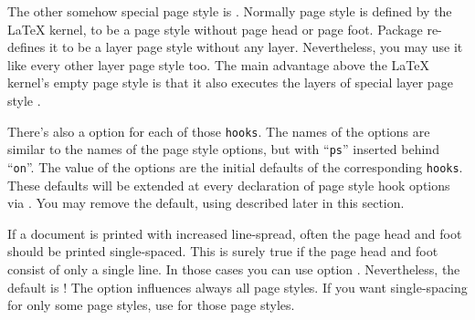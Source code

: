 The other somehow special page style is . Normally page style
 is defined by the \LaTeX{} kernel, to be a page style
without page head or page foot. Package  re-defines it to be
a layer page style without any layer. Nevertheless, you may use it like every
other layer page style too. The main advantage above the \LaTeX{} kernel's
empty page style is that it also executes the layers of special layer page
style .%
\EndIndexGroup


\begin{Declaration}
\end{Declaration}
There's also a \KOMAScript{} option for each of those \texttt{hooks}. The
names of the \KOMAScript{} options are similar to the names of the page style
options, but with ``\texttt{ps}'' inserted behind ``\texttt{on}''. The value
of the \KOMAScript{} options are the initial defaults of the corresponding
\texttt{hooks}. These defaults will be extended at every declaration of page
style hook options via . You may remove the default, using
 described later in this section.%
\EndIndexGroup


\begin{Declaration}
\end{Declaration}
If a
document is printed with increased line-spread, often the page head and foot
should be printed single-spaced. This is surely true if the page head and foot
consist of only a single line. In those cases you can use \KOMAScript{} option
. Nevertheless, the default is
! The option influences always all page
styles. If you want single-spacing for only some page styles, use
 for
those page styles.%
\EndIndexGroup


